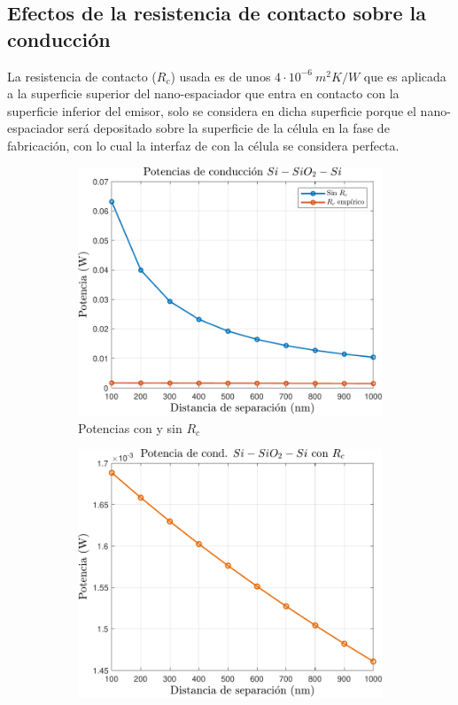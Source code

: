 \subsection{Efectos de la resistencia de contacto sobre la conducción}
La resistencia de contacto ($R_c$) usada es de unos $4\cdot 10^{-6} \ m^2 K/W$ \cite{nf_TPV_Pillars_SiO2} que es aplicada a la superficie superior del nano-espaciador que entra en contacto con la superficie inferior del emisor, solo se considera en dicha superficie porque el nano-espaciador será depositado sobre la superficie de la célula en la fase de fabricación, con lo cual la interfaz de con la célula se considera perfecta.
\begin{figure}[H]
	\centering
	\begin{subfigure}[b]{0.49\textwidth}
		\centering
		\includegraphics[width=1.0\textwidth]{figuras/Resultados/conduccion/pdf/Prc_SiSiO2Si.pdf}
		\caption{Potencias con y sin $R_c$}
		\label{fig:Prc_SiSiO2Si}
	\end{subfigure}
	\hfill
	\begin{subfigure}[b]{0.49\textwidth}
		\centering
		\includegraphics[width=1.0\textwidth]{figuras/Resultados/conduccion/pdf/Prc2_SiSiO2Si.pdf}

\end{subfigure}
\end{figure}
